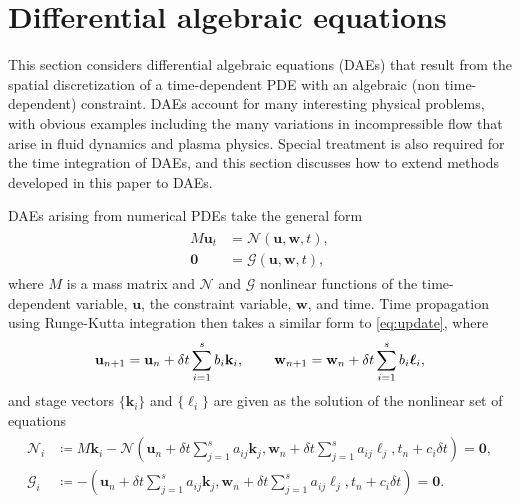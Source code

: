 \documentclass[review]{siamart}
\begin{document}
\section{Differential algebraic equations}\label{sec:dae}

This section considers differential algebraic equations (DAEs) that result from
the spatial discretization of a time-dependent PDE with an algebraic (non
time-dependent) constraint. DAEs account for many interesting physical problems,
with obvious examples including the many variations in incompressible flow that
arise in fluid dynamics and plasma physics. Special treatment is also required
for the time integration of DAEs, and this section discusses how to extend
methods developed in this paper to DAEs.

DAEs arising from numerical PDEs take the general form
%
\begin{align}\label{eq:dae}
\begin{split}
M\mathbf{u}_t & = \mathcal{N}(\mathbf{u},\mathbf{w},t), \\
\mathbf{0} & = \mathcal{G}(\mathbf{u},\mathbf{w},t),
\end{split}
\end{align}
%
where $M$ is a mass matrix and $\mathcal{N}$ and $\mathcal{G}$ nonlinear
functions of the time-dependent variable, $\mathbf{u}$, the constraint
variable, $\mathbf{w}$, and time.
Time propagation using Runge-Kutta integration then takes a similar form to
\eqref{eq:update}, where
%
\begin{align*}
\mathbf{u}_{n+1} = \mathbf{u}_n + \delta t\sum_{i=1}^s b_i\mathbf{k}_i, \hspace{5ex}
\mathbf{w}_{n+1} = \mathbf{w}_n + \delta t\sum_{i=1}^s b_i\boldsymbol{\ell}_i,
\end{align*}
%
and stage vectors $\{\mathbf{k}_i\}$ and $\{\boldsymbol{\ell}_i\}$ are
given as the solution of the nonlinear set of equations
\cite[Ch. 4]{brenan1995numerical}
%
\begin{align}\label{eq:dae_stage}
\begin{split}
\mathcal{N}_i &\coloneqq M\mathbf{k}_i -
	\mathcal{N} \left (\mathbf{u}_{n} + \delta t\sum_{j=1}^s a_{ij}\mathbf{k}_j,
	\mathbf{w}_{n} + \delta t\sum_{j=1}^s a_{ij}\boldsymbol{\ell}_j, t_{n} + c_i\delta t\right)
	= \mathbf{0}, \\
\mathcal{G}_i &\coloneqq - \left (\mathbf{u}_{n} + \delta t\sum_{j=1}^s a_{ij}\mathbf{k}_j,
	\mathbf{w}_{n} + \delta t\sum_{j=1}^s a_{ij}\boldsymbol{\ell}_j, t_{n} + c_i\delta t\right)
	= \mathbf{0}.
\end{split}
\end{align}
%
\end{document}

